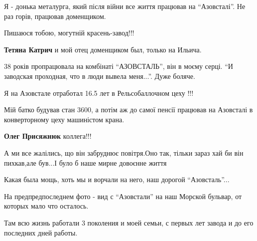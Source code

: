  
 
 
 
 

\qqSecCmt


Я - донька металурга, який після війни все життя працював на
\enquote{Азовсталі}. Не раз горів, працював доменщиком.

Пишаюся тобою, могутній красень-завод!!!

\begin{itemize} %
\textbf{Тетяна Катрич} и мой отец доменщиком был, только на Ильича.


38 років пропрацювала на комбінаті \enquote{АЗОВСТАЛЬ}, він в моєму серці. \enquote{И заводская
проходная, что в люди вывела меня...}. Дуже боляче.
\end{itemize} %


Я на Азовстале отработал 16.5 лет в Рельсобаллочном цеху !!!


Мій батко будував стан 3600, а потім аж до самої пенсії працював на Азовсталі в
конверторному цеху машиністом крана.

\begin{itemize} %
\textbf{Олег Присяжнюк} коллега!!!
\end{itemize} %


А ми все жалілись, що він забруднює повітря.Оно так, тільки зараз хай би він
пихкав,але був...І було б наше мирне довоєнне життя


Какая была мощь, хоть мы и ворчали на него, наш дорогой \enquote{Азовсталь}...


На предпредпоследнем фото - вид с \enquote{Азовстали} на наш Морской бульвар, от
которых мало что осталось.

Там всю жизнь работали 3 поколения и моей семьи, с первых лет завода и до его
последних дней работы.

